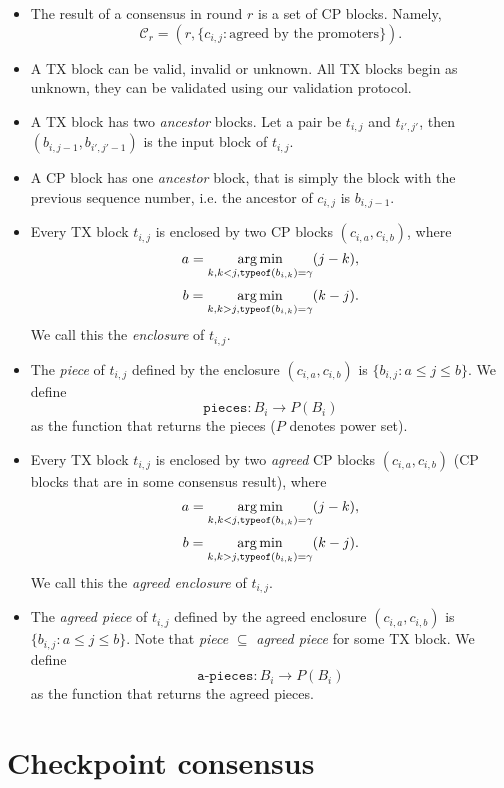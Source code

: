 \begin{itemize}
\item The result of a consensus in round $r$ is a set of CP blocks. Namely,
  $$\mathcal{C}_r = (r, \{ c_{i,j} : \text{agreed by the promoters}\}).$$

\item A TX block can be valid, invalid or unknown. All TX blocks begin as
  unknown, they can be validated using our validation protocol.

\item A TX block has two \emph{ancestor} blocks. Let a pair be $t_{i,j}$ and
  $t_{i',j'}$, then $(b_{i, j-1}, b_{i', j'-1})$ is the input block of $t_{i,j}$.

\item A CP block has one \emph{ancestor} block, that is simply the block with
  the previous sequence number, i.e. the ancestor of $c_{i,j}$ is $b_{i,j-1}$.

\item Every TX block $t_{i,j}$ is enclosed by two CP blocks $(c_{i,a},
  c_{i,b})$, where
  $$a = \operatorname*{arg\,min}_{k, k < j, \texttt{typeof}(b_{i,k}) = \gamma}(j - k),$$
  $$b = \operatorname*{arg\,min}_{k, k > j, \texttt{typeof}(b_{i,k}) = \gamma}(k - j).$$
  We call this the \emph{enclosure} of $t_{i,j}$.

\item The \emph{piece} of $t_{i,j}$ defined by the enclosure $(c_{i,a},
  c_{i,b})$ is $\{b_{i,j} : a \le j \le b\}$.
  We define
  $$ \texttt{pieces}: B_i \rightarrow P(B_i) $$
  as the function that returns the pieces ($P$ denotes power set).

\item Every TX block $t_{i,j}$ is enclosed by two \emph{agreed} CP blocks
  $(c_{i,a}, c_{i,b})$ (CP blocks that are in some consensus result), where
  $$a = \operatorname*{arg\,min}_{k, k < j, \texttt{typeof}(b_{i,k}) = \gamma}(j - k),$$
  $$b = \operatorname*{arg\,min}_{k, k > j, \texttt{typeof}(b_{i,k}) = \gamma}(k - j).$$
  We call this the \emph{agreed enclosure} of $t_{i,j}$.

\item The \emph{agreed piece} of $t_{i,j}$ defined by the agreed enclosure
  $(c_{i,a}, c_{i,b})$ is $\{b_{i,j} : a \le j \le b\}$. Note that \emph{piece}
  $\subseteq$ \emph{agreed piece} for some TX block.
  We define
  $$ \texttt{a-pieces}: B_i \rightarrow P(B_i) $$
  as the function that returns the agreed pieces.

\end{itemize}

\section{Checkpoint consensus}

